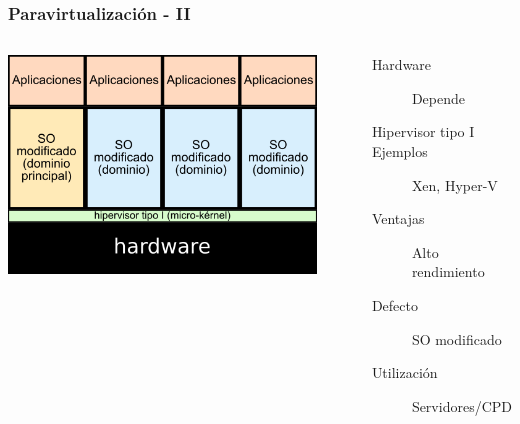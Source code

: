 \documentclass{beamer}
\begin{document}
\begin{frame} \frametitle{Paravirtualización - II}
  \begin{columns}
    \begin{center}
    \includegraphics[width=0.9\textwidth]{img/paravirt_microkernel.png}      
    \end{center}
    \begin{description}
    \item[Hardware] Depende
    \item[Hipervisor tipo I]
    \item[Ejemplos] Xen, Hyper-V
    \item [Ventajas] Alto rendimiento
    \item[Defecto] SO modificado
    \item[Utilización] Servidores/CPD
    \end{description}
  \end{columns}
\end{frame}
\end{document}
